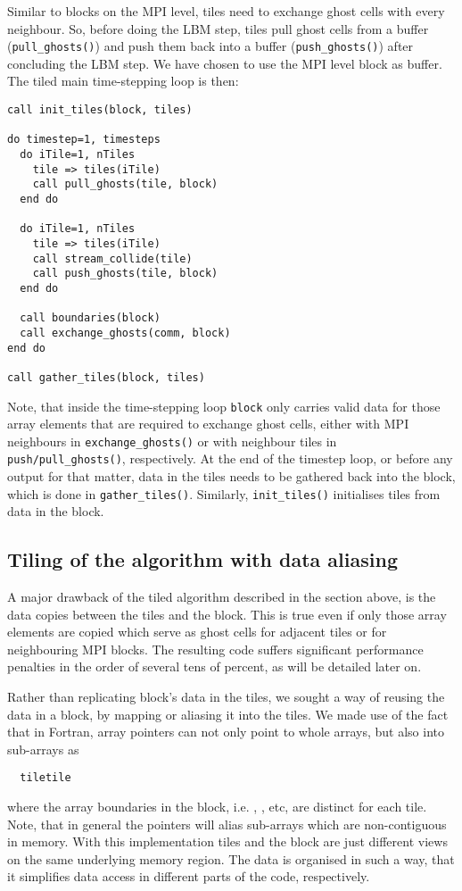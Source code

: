 \documentclass[conference]{IEEEtran}
\begin{document}
Similar to blocks on the MPI level, tiles need to exchange ghost
cells with every neighbour. So, before doing the LBM step, tiles pull
ghost cells from a buffer (\verb!pull_ghosts()!) and push them back into a
buffer (\verb!push_ghosts()!) after concluding the LBM step. We have chosen to use the MPI
level block as buffer. The tiled main time-stepping loop is then:
\begin{lstlisting}
call init_tiles(block, tiles)

do timestep=1, timesteps
  do iTile=1, nTiles
    tile => tiles(iTile)
    call pull_ghosts(tile, block)
  end do

  do iTile=1, nTiles
    tile => tiles(iTile)
    call stream_collide(tile)
    call push_ghosts(tile, block)
  end do

  call boundaries(block)
  call exchange_ghosts(comm, block)
end do

call gather_tiles(block, tiles)
\end{lstlisting}
Note, that inside the time-stepping loop \verb!block! only carries
 valid data for those array elements that are required to exchange ghost
 cells, either with MPI neighbours in \verb!exchange_ghosts()! or with
 neighbour tiles in \verb!push/pull_ghosts()!, respectively. At the end
 of the timestep loop, or before any output for that matter, data in the tiles
 needs to be gathered back into the block, which is done in
 \verb!gather_tiles()!. Similarly,  \verb!init_tiles()! initialises
 tiles from data in the block.

\subsection{Tiling of the algorithm with data
  aliasing} \label{sec:aliasing}

A major drawback of the tiled algorithm described in the section
above, is the data copies between the tiles and the block. This is true even if
only those array elements are copied which serve as ghost cells for adjacent
tiles or for neighbouring MPI blocks. The resulting code suffers
significant performance penalties in the order of several tens of
percent, as will be detailed later on.

Rather than replicating block's data in the tiles, we sought a way of
reusing the data in a block, by mapping or aliasing it into the tiles. 
We made use of the fact that in Fortran, array pointers can not only point to whole
arrays, but also into sub-arrays as
\begin{lstlisting}
  tiletile\end{lstlisting}
where the array boundaries in the block, i.e. , , etc, are
distinct for each tile.  Note, that in general the pointers will alias
sub-arrays which are non-contiguous in memory. With this
implementation tiles and the block are just different views on the
same underlying memory region. The data is organised in such a way, that
it simplifies data access in different parts of the code, respectively.
\end{document}
